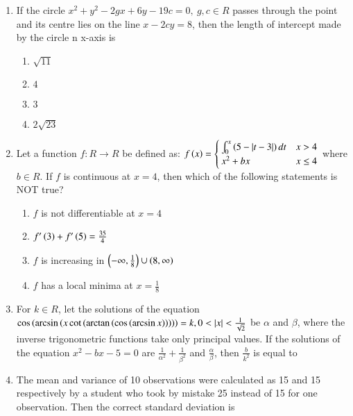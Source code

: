 \documentclass[journal]{IEEEtran}
\begin{document}
\begin{enumerate}
    \item If the circle $x^2+y^2-2gx+6y-19c=0,\ g,c\in R$ passes through the point  and its centre lies on the line $x-2cy=8$, then the length of intercept made by the circle n x-axis is 

		\begin{multicols}{4}
			\begin{enumerate}
				\item $\sqrt{11}$
				\item $4$
				\item $3$
				\item $2\sqrt{23}$
			\end{enumerate}
		\end{multicols}

    \item Let a function $f:R\to R$ be defined as:
    $f\left(x\right)=
    \begin{cases}
    \int_0^x\left(5-\left\vert t-3\right\vert\right)dt & x>4\\
    x^2+bx & x\leq 4
    \end{cases}
    $ where $b\in R$. If $f$ is continuous at $x=4$, then which of the following statements is NOT true?

		\begin{multicols}{2}
			\begin{enumerate}
				\item $f$ is not differentiable at $x=4$
				\item $f'\left(3\right)+f'\left(5\right)=\frac{35}{4}$
				\item $f$ is increasing in $\left(-\infty, \frac{1}{8}\right)\cup\left(8,\infty\right)$
				\item $f$ has a local minima at $x=\frac{1}{8}$
			\end{enumerate}
		\end{multicols}
  
    \item For $k\in R$, let the solutions of the equation $\cos\left(\arcsin\left(x\cot\left(\arctan\left(\cos\left(\arcsin x\right)\right)\right)\right)\right)=k,0<\left\vert x\right\vert<\frac{1}{\sqrt{2}}$ be $\alpha$ and $\beta$, where the inverse trigonometric functions take only principal values. If the solutions of the equation $x^2-bx-5=0$ are $\frac{1}{\alpha^2}+\frac{1}{\beta^2}$ and $\frac{\alpha}{\beta}$, then $\frac{b}{k^2}$ is equal to

    \item The mean and variance of 10 observations were calculated as 15 and 15 respectively by a student who took by mistake 25 instead of 15 for one observation. Then the correct standard deviation is
		

\end{enumerate}
\end{document}
